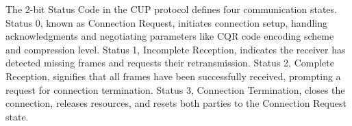 \documentclass[preprint,12pt]{elsarticle}
\begin{document}
The 2-bit Status Code in the CUP protocol defines four communication states. Status 0, known as Connection Request, initiates connection setup, handling acknowledgments and negotiating parameters like CQR code encoding scheme and compression level. Status 1, Incomplete Reception, indicates the receiver has detected missing frames and requests their retransmission. Status 2, Complete Reception, signifies that all frames have been successfully received, prompting a request for connection termination. Status 3, Connection Termination, closes the connection, releases resources, and resets both parties to the Connection Request state.



\end{document}
